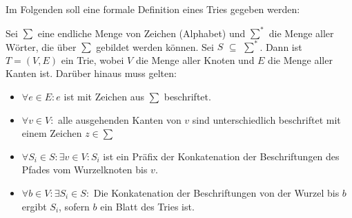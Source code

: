\newpage
Im Folgenden soll eine formale Definition eines Tries gegeben werden:
\newline
\begin{defi}
	Sei $\sum$ eine endliche Menge von Zeichen (Alphabet) und $\sum^{*}$ die Menge aller Wörter, die über $\sum$ gebildet werden können. Sei $S$ $\subseteq$ $\sum^{*}$. Dann ist $T = (V, E)$ ein Trie, wobei $V$ die Menge aller Knoten und $E$ die Menge aller Kanten ist. Darüber hinaus muss gelten:
	
	\begin{itemize}
		\item $\forall e \in E: e$ ist mit Zeichen aus $\sum$ beschriftet.
		\item $\forall v \in V:$ alle ausgehenden Kanten von $v$ sind unterschiedlich beschriftet mit einem Zeichen $z \in \sum$
		\item $\forall S_i \in S: \exists v \in V: S_i$ ist ein Präfix der Konkatenation der Beschriftungen des Pfades vom Wurzelknoten bis $v$.
		\item $\forall b \in V: \exists S_i \in S:$ Die Konkatenation der Beschriftungen von der Wurzel bis $b$ ergibt $S_i$, sofern $b$ ein Blatt des Tries ist.
	\end{itemize}
\end{defi}

